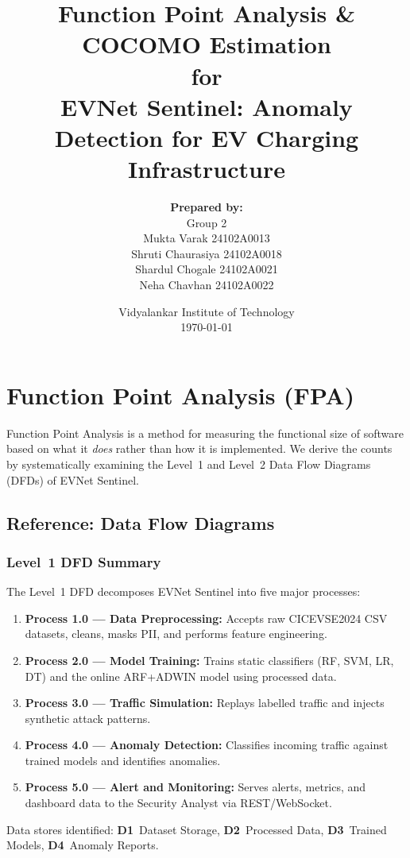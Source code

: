 \documentclass[11pt, a4paper]{article}
\title{\textbf{Function Point Analysis \& COCOMO Estimation}\\ \vspace{0.5cm} for \\ \vspace{0.5cm} \textbf{EVNet Sentinel: Anomaly Detection for EV Charging Infrastructure}}
\author{\textbf{Prepared by:} \\ Group 2 \\ Mukta Varak 24102A0013 \\ Shruti Chaurasiya 24102A0018 \\ Shardul Chogale 24102A0021 \\ Neha Chavhan 24102A0022}
\date{Vidyalankar Institute of Technology \\ \today}
\begin{document}
\maketitle
\thispagestyle{empty}
\newpage

\tableofcontents
\newpage

\section{Function Point Analysis (FPA)}

Function Point Analysis is a method for measuring the functional size of software based on what it \emph{does} rather than how it is implemented. We derive the counts by systematically examining the Level~1 and Level~2 Data Flow Diagrams (DFDs) of EVNet Sentinel.

\subsection{Reference: Data Flow Diagrams}

\subsubsection{Level~1 DFD Summary}
The Level~1 DFD decomposes EVNet Sentinel into five major processes:
\begin{enumerate}
    \item \textbf{Process 1.0 --- Data Preprocessing:} Accepts raw CICEVSE2024 CSV datasets, cleans, masks PII, and performs feature engineering.
    \item \textbf{Process 2.0 --- Model Training:} Trains static classifiers (RF, SVM, LR, DT) and the online ARF+ADWIN model using processed data.
    \item \textbf{Process 3.0 --- Traffic Simulation:} Replays labelled traffic and injects synthetic attack patterns.
    \item \textbf{Process 4.0 --- Anomaly Detection:} Classifies incoming traffic against trained models and identifies anomalies.
    \item \textbf{Process 5.0 --- Alert and Monitoring:} Serves alerts, metrics, and dashboard data to the Security Analyst via REST/WebSocket.
\end{enumerate}

Data stores identified: \textbf{D1}~Dataset Storage, \textbf{D2}~Processed Data, \textbf{D3}~Trained Models, \textbf{D4}~Anomaly Reports.
\end{document}
